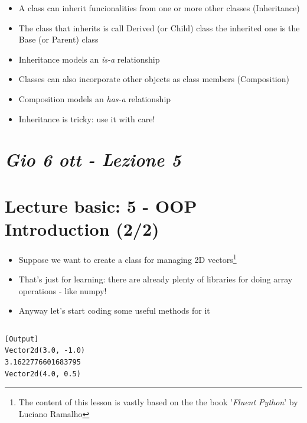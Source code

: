 \hfill
\vfill
  

\begin{tcolorbox}[width=\textwidth,colback={white},title={Short summary },colbacktitle=cyan,coltitle=black]
  \begin{itemize}
    \item A class can inherit funcionalities from one or more other classes (Inheritance)
    \medskip
    \item The class that inherits is call Derived (or Child) class the inherited one is the Base (or Parent) class
    \medskip
    \item Inheritance models an \emph{is-a} relationship
    \medskip
    \item Classes can also incorporate other objects as class members (Composition)
    \medskip
    \item Composition models an \emph{has-a} relationship
    \medskip
    \item Inheritance is tricky: use it with care!
   \end{itemize}

\end{tcolorbox}

\newpage
\section{\textit{Gio 6 ott - Lezione 5}}

\section{Lecture basic: 5 - OOP Introduction (2/2)}

  \begin{itemize}
    \item Suppose we want to create a class for managing 2D vectors\footnote{%
      The content of this lesson is vastly based on the the book '\emph{Fluent Python}' by Luciano Ramalho}
    \item That's just for learning: there are already plenty of libraries for
          doing array operations - like numpy!
    \item Anyway let's start coding some useful methods for it
  \end{itemize}
  

\inputminted{python}{snippets/vector2d_naive.py}
\begin{verbatim}
[Output]
Vector2d(3.0, -1.0)
3.1622776601683795
Vector2d(4.0, 0.5)
\end{verbatim}

